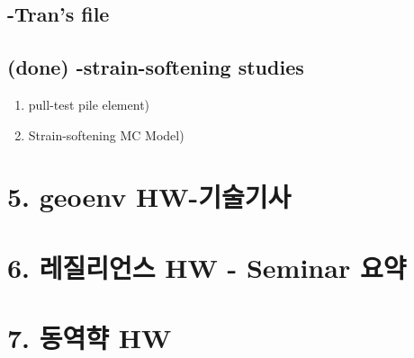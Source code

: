 \documentclass[a4paper, nobind]{templates/ociamthesis}
\providecommand{\tightlist}{%
  \setlength{\itemsep}{0pt}\setlength{\parskip}{0pt}}
\newcommand*{\bibtitle}{Works Cited}
\begin{document}
\hypertarget{trans-file}{%
\subsection{-Tran's file}\label{trans-file}}

\hypertarget{done--strain-softening-studies}{%
\subsection{(done) -strain-softening studies}\label{done--strain-softening-studies}}

\begin{enumerate}
\def\labelenumi{\arabic{enumi}.}
\tightlist
\item
  pull-test pile element)
\item
  Strain-softening MC Model)
\end{enumerate}

\hypertarget{geoenv-hw-uxae30uxc220uxae30uxc0ac}{%
\section{5. geoenv HW-기술기사}\label{geoenv-hw-uxae30uxc220uxae30uxc0ac}}

\hypertarget{uxb808uxc9c8uxb9acuxc5b8uxc2a4-hw---seminar-uxc694uxc57d}{%
\section{6. 레질리언스 HW - Seminar 요약}\label{uxb808uxc9c8uxb9acuxc5b8uxc2a4-hw---seminar-uxc694uxc57d}}

\hypertarget{uxb3d9uxc5eduxd591-hw}{%
\section{7. 동역햑 HW}\label{uxb3d9uxc5eduxd591-hw}}


\setlength{\baselineskip}{0pt} %

{\renewcommand*\MakeUppercase[1]{#1}%
\printbibliography[heading=bibintoc,title={\bibtitle}]}
\end{document}
